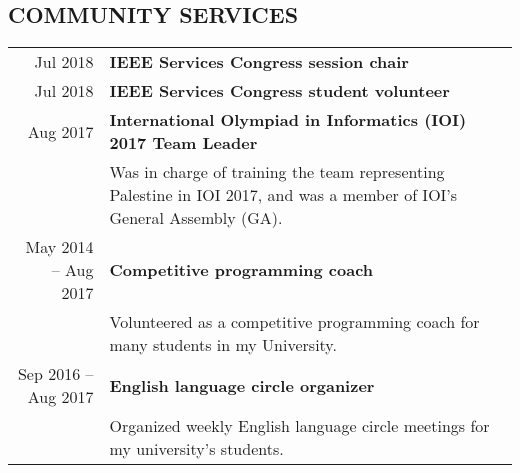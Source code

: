 
  \subsection*{COMMUNITY SERVICES}
  \begin{tabularx}{\linewidth}{r X }
  Jul 2018 & \bf IEEE Services Congress session chair\\
  
  Jul 2018 & \bf IEEE Services Congress student volunteer\\
  
  Aug 2017 & \bf International Olympiad in Informatics (IOI) 2017 Team Leader\\
    & Was in charge of training the team representing Palestine in IOI 2017, and was a member of IOI's General Assembly (GA).\\
    May 2014 -- Aug 2017 & \bf Competitive programming coach\\
    & Volunteered as a competitive programming coach for many students in my University.\\
    Sep 2016 -- Aug 2017 & \bf English language circle organizer\\
    & Organized weekly English language circle meetings for my university's students.\\
    \end{tabularx}